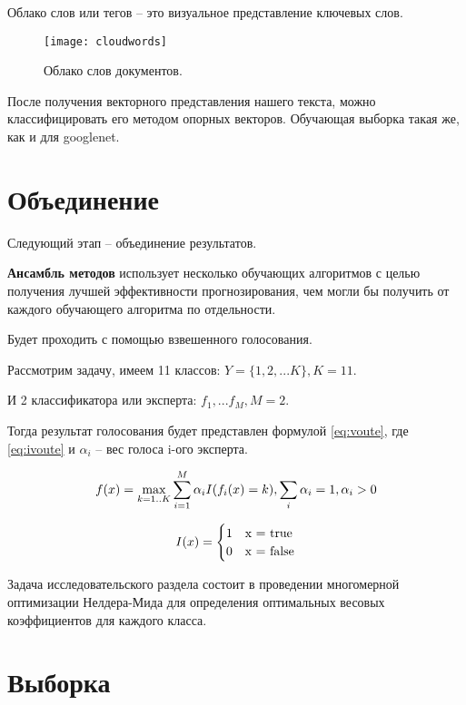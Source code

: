Облако слов или тегов -- это визуальное представление ключевых слов. 

\begin{figure}[H]
	\centering
	\texttt{[image: cloudwords]}
	\caption{Облако слов документов. }
	\label{img:cloudwords}
\end{figure}

После получения векторного представления нашего текста, можно классифицировать его методом опорных векторов. Обучающая выборка такая же, как и для googlenet.

\section{Объединение}

Следующий этап -- объединение результатов.

\textbf{Ансамбль методов} использует несколько обучающих алгоритмов с целью получения лучшей эффективности прогнозирования, чем могли бы получить от каждого обучающего алгоритма по отдельности.

Будет проходить с помощью взвешенного голосования.

Рассмотрим задачу, имеем 11 классов: $Y=\{1,2,...K\}, K=11$.

И 2 классификатора или эксперта: $f_1, ...f_M, M=2$.

Тогда результат голосования будет представлен формулой \ref{eq:voute}, где \ref{eq:ivoute} и $\alpha_i$ -- вес голоса i-ого эксперта.

\begin{equation}
	\centering
	f(x)=\max_{k=1..K}\sum_{i=1}^M\alpha_i I(f_i(x)=k), \sum_i \alpha_i=1, \alpha_i>0
	\label{eq:voute}
\end{equation}

\begin{equation}
	\centering
	I(x) = \begin{cases}
   1 &\text{x = true}\\
   0 &\text{x = false}
 \end{cases}
	\label{eq:ivoute}
\end{equation}

Задача исследовательского раздела состоит в проведении многомерной оптимизации Нелдера-Мида для определения оптимальных весовых коэффициентов для каждого класса.

\section{Выборка}


